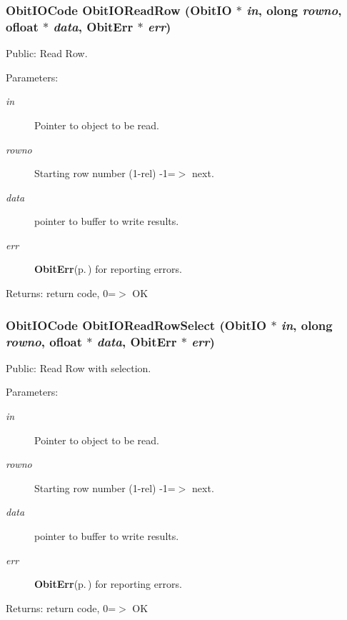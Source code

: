 \subsubsection{\setlength{\rightskip}{0pt plus 5cm}Obit\-IOCode Obit\-IORead\-Row ({\bf Obit\-IO} $\ast$ {\em in}, {\bf olong} {\em rowno}, {\bf ofloat} $\ast$ {\em data}, {\bf Obit\-Err} $\ast$ {\em err})}\label{ObitIO_8h_a40}


Public: Read Row. 

\begin{Desc}
\item[Parameters:]
\begin{description}
\item[{\em in}]Pointer to object to be read. \item[{\em rowno}]Starting row number (1-rel) -1=$>$ next. \item[{\em data}]pointer to buffer to write results. \item[{\em err}]{\bf Obit\-Err}{\rm (p.\,\pageref{structObitErr})} for reporting errors. \end{description}
\end{Desc}
\begin{Desc}
\item[Returns:]return code, 0=$>$ OK \end{Desc}
\subsubsection{\setlength{\rightskip}{0pt plus 5cm}Obit\-IOCode Obit\-IORead\-Row\-Select ({\bf Obit\-IO} $\ast$ {\em in}, {\bf olong} {\em rowno}, {\bf ofloat} $\ast$ {\em data}, {\bf Obit\-Err} $\ast$ {\em err})}\label{ObitIO_8h_a45}


Public: Read Row with selection. 

\begin{Desc}
\item[Parameters:]
\begin{description}
\item[{\em in}]Pointer to object to be read. \item[{\em rowno}]Starting row number (1-rel) -1=$>$ next. \item[{\em data}]pointer to buffer to write results. \item[{\em err}]{\bf Obit\-Err}{\rm (p.\,\pageref{structObitErr})} for reporting errors. \end{description}
\end{Desc}
\begin{Desc}
\item[Returns:]return code, 0=$>$ OK \end{Desc}

